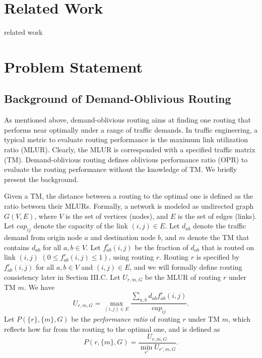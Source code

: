 \documentclass[conference]{IEEEtran}
\begin{document}
\section{Related Work}
related work

\section{Problem Statement}

\subsection{Background of Demand-Oblivious Routing}

As mentioned above, demand-oblivious routing aims at finding one routing that performs near optimally under a range of traffic demands. In traffic engineering, a typical metric to evaluate routing performance is the maximum link utilization ratio (MLUR). Clearly, the MLUR is corresponded with a specified traffic matrix (TM). Demand-oblivious routing defines oblivious performance ratio (OPR) to evaluate the routing performance without the knowledge of TM. We briefly present the background.

Given a TM, the distance between a routing to the optimal one is defined as the ratio between their MLURs. Formally, a network is modeled as undirected graph $G(V, E)$, where $V$ is the set of vertices (nodes), and $E$ is the set of edges (links). Let $cap_{ij}$ denote the capacity of the link $(i, j) \in E$. Let $d_{ab}$ denote the traffic demand from origin node $a$ and destination node $b$, and $m$ denote the TM that contains $d_{ab}$ for all $a, b \in V$. Let $f^r_{ab}(i,j)$ be the fraction of $d_{ab}$ that is routed on link $(i, j)$ $(0 \leq f^r_{ab}(i,j) \leq 1)$, using routing $r$. Routing $r$ is specified by $f^r_{ab}(i,j)$ for all $a, b \in V$ and $(i, j) \in E$, and we will formally define routing consistency later in Section III.C. Let $U_{r, m, G}$ be the MLUR of routing $r$ under TM $m$. We have
\begin{equation}
	U_{r, m, G} = \max_{(i,j)\in E} \frac{\sum_{a,b} d_{ab}f^r_{ab}(i,j)}{cap_{ij}}.
\end{equation}
Let $P(\{ r \},\{ m \}, G)$ be the \emph{performance ratio} of routing $r$ under TM $m$, which reflects how far from the routing to the optimal one, and is defined as
\begin{equation}
	P(r,\{ m \}, G) = \frac{U_{r,m,G}}{\min_{r'} U_{r', m, G}}.
\end{equation}
\end{document}

